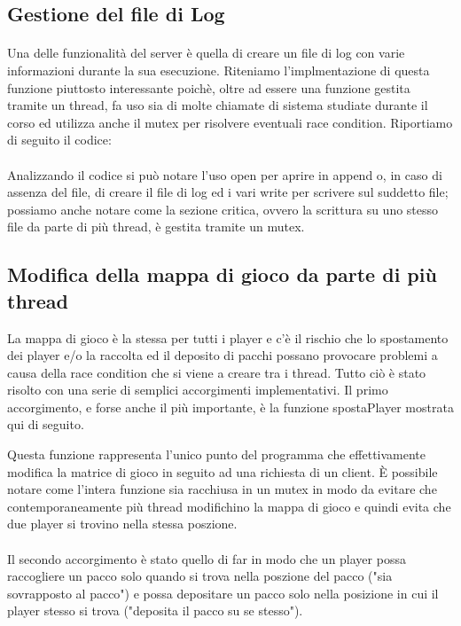 \documentclass[a4paper]{article}
\begin{document}
\subsection{Gestione del file di Log}
\paragraph{}
Una delle funzionalità del server è quella di creare un file di log con varie informazioni durante la sua esecuzione.
Riteniamo l'implmentazione di questa funzione piuttosto interessante poichè, oltre ad essere una funzione gestita tramite un thread, fa uso sia di molte chiamate di sistema studiate durante il corso 
ed utilizza anche il mutex per risolvere eventuali race condition.
Riportiamo di seguito il codice:

\paragraph{}
Analizzando il codice si può notare l'uso open per aprire in append o, in caso di assenza del file, di creare
il file di log ed i vari write per scrivere sul suddetto file; possiamo anche notare come la sezione critica, ovvero 
la scrittura su uno stesso file da parte di più thread, è gestita tramite un mutex.

\subsection{Modifica della mappa di gioco da parte di più thread}
La mappa di gioco è la stessa per tutti i player e c'è il rischio che lo spostamento dei player e/o la raccolta ed il deposito di pacchi possano provocare problemi
a causa della race condition che si viene a creare tra i thread. Tutto ciò è stato risolto con una serie di semplici accorgimenti implementativi.
Il primo accorgimento, e forse anche il più importante, è la funzione spostaPlayer mostrata qui di seguito.

Questa funzione rappresenta l'unico punto del programma che effettivamente modifica la matrice di gioco in seguito ad una richiesta di un client.
È possibile notare come l'intera funzione sia racchiusa in un mutex in modo da evitare che contemporaneamente più thread modifichino la mappa di gioco e 
quindi evita che due player si trovino nella stessa poszione.
\paragraph{}Il secondo accorgimento è stato quello di far in modo che un player possa raccogliere un pacco solo quando si trova nella poszione del pacco
("sia sovrapposto al pacco") e possa depositare un pacco solo nella posizione in cui il player stesso si trova ("deposita il pacco su se stesso").
\end{document}
